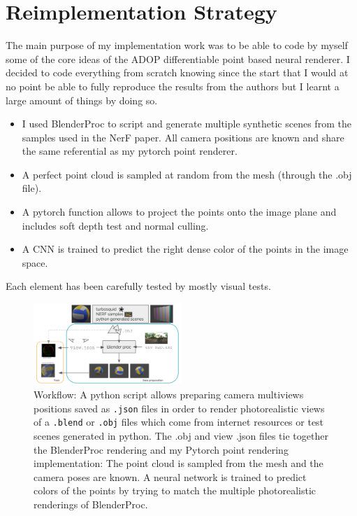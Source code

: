 \section{Reimplementation Strategy}
\label{sec:remplementation}

The main purpose of my implementation work was to be able to code by myself some of the core ideas of the ADOP differentiable point based neural renderer.
I decided to code everything from scratch knowing since the start that I would at no point be able to fully reproduce the results from the authors but I learnt a large amount of things by doing so.
\begin{itemize}
    \item I used BlenderProc \cite{Denninger2023} to script and generate multiple synthetic scenes from the samples used in the NerF paper. All camera positions are known and share the same referential as my pytorch point renderer.
    \item A perfect point cloud is sampled at random from the mesh (through the .obj file).
    \item A pytorch function allows to project the points onto the image plane and includes soft depth test and normal culling.
    \item A CNN is trained to predict the right dense color of the points in the image space.
\end{itemize}

Each element has been carefully tested by mostly visual tests.

\begin{figure}[H]
    \centering
    \includegraphics[width=0.5\textwidth]{figures/data_prep_and_training.png}
    \caption{Workflow: A python script allows preparing camera multiviews positions saved as \texttt{.json} files in order to render photorealistic views of a \texttt{.blend} or  \texttt{.obj} files which come from internet resources or test scenes generated in python.
    The .obj and view .json files tie together the BlenderProc rendering and my Pytorch point rendering implementation: The point cloud is sampled from the mesh and the camera poses are known. A neural network is trained to predict colors of the points by trying to match the multiple photorealistic renderings of BlenderProc.}
    \label{fig:data_and_train}
\end{figure}




